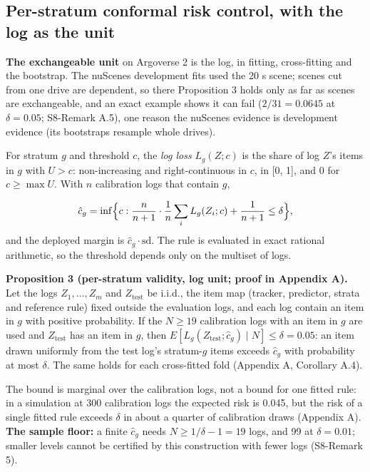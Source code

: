 \documentclass{ieeeaccess}
\begin{document}
\subsection{Per-stratum conformal risk control, with the log as the unit}
\textbf{The exchangeable unit} on Argoverse 2 is the log, in fitting, cross-fitting and the bootstrap. The nuScenes development fits used the 20 s scene; scenes cut from one drive are dependent, so there Proposition 3 holds only as far as scenes are exchangeable, and an exact example shows it can fail ($2/31 = 0.0645$ at $\delta = 0.05$; S8-Remark A.5), one reason the nuScenes evidence is development evidence (its bootstraps resample whole drives).

For stratum $g$ and threshold $c$, the \emph{log loss} $L_{g}(Z; c)$ is the share of log $Z$'s items in $g$ with $U > c$: non-increasing and right-continuous in $c$, in [0, 1], and 0 for $c \geq \max U$. With $n$ calibration logs that contain $g$,

\begin{equation*}
\hat{c}_g = \inf\Bigl\{c : \frac{n}{n + 1}\cdot\frac{1}{n}\sum_i L_g(Z_i; c) + \frac{1}{n + 1} \leq \delta\Bigr\},
\end{equation*}
and the deployed margin is $\hat{c}_{g}\cdot\mathrm{sd}$. The rule is evaluated in exact rational arithmetic, so the threshold depends only on the multiset of logs.

\textbf{Proposition 3 (per-stratum validity, log unit; proof in Appendix A).} Let the logs $Z_{1}, \dots, Z_{m}$ and $Z_{\mathrm{test}}$ be i.i.d., the item map (tracker, predictor, strata and reference rule) fixed outside the evaluation logs, and each log contain an item in $g$ with positive probability. If the $N \geq 19$ calibration logs with an item in $g$ are used and $Z_{\mathrm{test}}$ has an item in $g$, then $E[L_{g}(Z_{\mathrm{test}}; \hat{c}_{g}) \mid N] \leq \delta = 0.05$: an item drawn uniformly from the test log's stratum-$g$ items exceeds $\hat{c}_{g}$ with probability at most $\delta$. The same holds for each cross-fitted fold (Appendix A, Corollary A.4).

The bound is marginal over the calibration logs, not a bound for one fitted rule: in a simulation at 300 calibration logs the expected risk is 0.045, but the risk of a single fitted rule exceeds $\delta$ in about a quarter of calibration draws (Appendix A). \textbf{The sample floor:} a finite $\hat{c}_{g}$ needs $N \geq 1/\delta - 1 = 19$ logs, and 99 at $\delta = 0.01$; smaller levels cannot be certified by this construction with fewer logs (S8-Remark 5).
\end{document}
